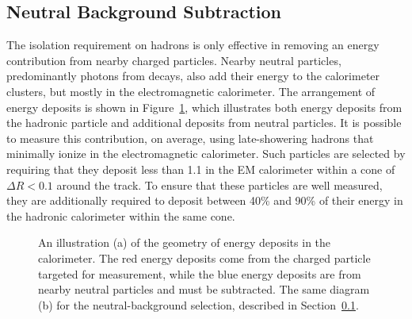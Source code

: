 \subsection{Neutral Background Subtraction}
\label{sec:neutral_bg}

The isolation requirement on hadrons is only effective in removing an energy contribution from nearby charged particles. 
Nearby neutral particles, predominantly photons from \piz decays, also add their energy to the calorimeter clusters, but mostly in the electromagnetic calorimeter. 
The arrangement of energy deposits is shown in Figure~\ref{fig:eoverp_cartoon}, which illustrates both energy deposits from the hadronic particle and additional deposits from neutral particles.
It is possible to measure this contribution, on average, using late-showering hadrons that minimally ionize in the electromagnetic calorimeter. 
Such particles are selected by requiring that they deposit less than 1.1 \GeV in the EM calorimeter within a cone of $\Delta R < 0.1$ around the track. 
To ensure that these particles are well measured, they are additionally required to deposit between 40\% and 90\% of their energy in the hadronic calorimeter within the same cone. 

\begin{figure}[htbp]
\centering
{}
\caption{An illustration (a) of the geometry of energy deposits in the calorimeter. The red energy deposits come from the charged particle targeted for measurement, while the blue energy deposits are from nearby neutral particles and must be subtracted. The same diagram (b) for the neutral-background selection, described in Section~\ref{sec:neutral_bg}.}
\label{fig:eoverp_cartoon}
\end{figure}

